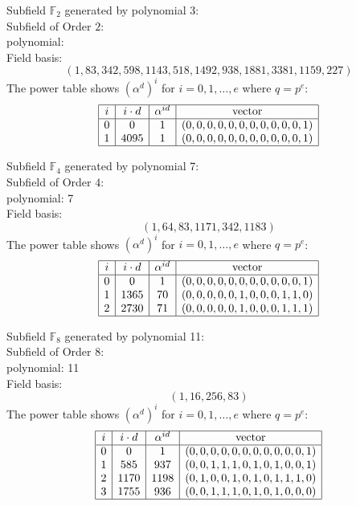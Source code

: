 Subfield ${\mathbb F}_{2}$ generated by polynomial 3:\\
Subfield of Order $2$:\\
polynomial: \\
Field basis:\\
$$
( 1, 83, 342, 598, 1143, 518, 1492, 938, 1881, 3381, 1159, 227 )
$$
The power table shows $(\alpha^d)^i$ for $i=0,1,\ldots,e$ where $q=p^{e}$:
$$
\begin{array}{|c|c|c|c|}
\hline
i & i\cdot d  & \alpha^{id} & \mbox{vector} \\
\hline
0 & 0 & 1 & (0,0,0,0,0,0,0,0,0,0,0,1)\\
1 & 4095 & 1 & (0,0,0,0,0,0,0,0,0,0,0,1)\\
\hline
\end{array}
$$

\bigskip

Subfield ${\mathbb F}_{4}$ generated by polynomial 7:\\
Subfield of Order $4$:\\
polynomial: 7\\
Field basis:\\
$$
( 1, 64, 83, 1171, 342, 1183 )
$$
The power table shows $(\alpha^d)^i$ for $i=0,1,\ldots,e$ where $q=p^{e}$:
$$
\begin{array}{|c|c|c|c|}
\hline
i & i\cdot d  & \alpha^{id} & \mbox{vector} \\
\hline
0 & 0 & 1 & (0,0,0,0,0,0,0,0,0,0,0,1)\\
1 & 1365 & 70 & (0,0,0,0,0,1,0,0,0,1,1,0)\\
2 & 2730 & 71 & (0,0,0,0,0,1,0,0,0,1,1,1)\\
\hline
\end{array}
$$

\bigskip

Subfield ${\mathbb F}_{8}$ generated by polynomial 11:\\
Subfield of Order $8$:\\
polynomial: 11\\
Field basis:\\
$$
( 1, 16, 256, 83 )
$$
The power table shows $(\alpha^d)^i$ for $i=0,1,\ldots,e$ where $q=p^{e}$:
$$
\begin{array}{|c|c|c|c|}
\hline
i & i\cdot d  & \alpha^{id} & \mbox{vector} \\
\hline
0 & 0 & 1 & (0,0,0,0,0,0,0,0,0,0,0,1)\\
1 & 585 & 937 & (0,0,1,1,1,0,1,0,1,0,0,1)\\
2 & 1170 & 1198 & (0,1,0,0,1,0,1,0,1,1,1,0)\\
3 & 1755 & 936 & (0,0,1,1,1,0,1,0,1,0,0,0)\\
\hline
\end{array}
$$

